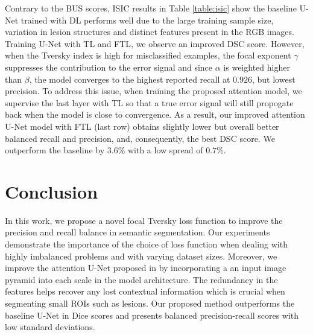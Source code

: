 \documentclass{article}
\begin{document}
Contrary to the BUS scores, ISIC results in Table \ref{table:isic} show the baseline U-Net trained with DL performs well due to the large training sample size, variation in lesion structures and distinct features present in the RGB images. Training U-Net with TL and FTL, we observe an improved DSC score. However, when the Tversky index is high for misclassified examples, the focal exponent $\gamma$ suppresses the contribution to the error signal and since $\alpha$ is weighted higher than $\beta$, the model converges to the highest reported recall at $0.926$, but lowest precision. To address this issue, when training the proposed attention model, we supervise the last layer with TL so that a true error signal will still propogate back when the model is close to convergence. As a result, our improved attention U-Net model with FTL (last row) obtains slightly lower but overall better balanced recall and precision, and, consequently, the best DSC score. We outperform the baseline by $3.6\%$ with a low spread of $0.7\%$. 

\section{Conclusion}

In this work, we propose a novel focal Tversky loss function to improve the precision and recall balance in semantic segmentation. Our experiments demonstrate the importance of the choice of loss function when dealing with highly imbalanced problems and with varying dataset sizes. Moreover, we improve the attention U-Net proposed in \cite{oktay} by incorporating a an input image pyramid into each scale in the model architecture. The redundancy in the features helps recover any lost contextual information which is crucial when segmenting small ROIs such as lesions. Our proposed method outperforms the baseline U-Net in Dice scores and presents balanced precision-recall scores with low standard deviations.
\vfill
\pagebreak


\label{sec:ref}
\newpage


\end{document}
